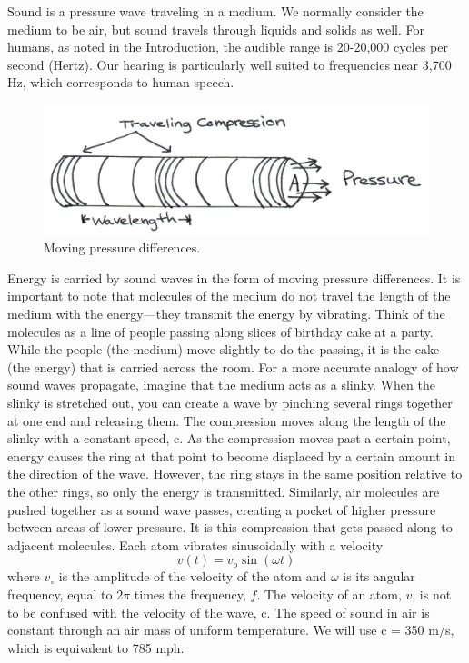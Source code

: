 Sound is a pressure wave traveling in a medium.  We normally consider the medium to be air, but sound travels through liquids and solids as well.  For humans, as noted in the Introduction, the audible range is 20-20,000 cycles per second (Hertz).  Our hearing is particularly well suited to frequencies near 3,700 Hz, which corresponds to human speech.  
\begin{figure}[htb]
	\centering
	\includegraphics[width=\textwidth]{./figures/Topic3/Fig3-1.jpg}
	\caption{Moving pressure differences.}
	\label{Fig3-1}
\end{figure}
Energy is carried by sound waves in the form of moving pressure differences.  It is important to note that molecules of the medium do not travel the length of the medium with the energy—they transmit the energy by vibrating.   Think of the molecules as a line of people passing along slices of birthday cake at a party.  While the people (the medium) move slightly to do the passing, it is the cake (the energy) that is carried across the room.  For a more accurate analogy of how sound waves propagate, imagine that the medium acts as a slinky.  When the slinky is stretched out, you can create a wave by pinching several rings together at one end and releasing them.  The compression moves along the length of the slinky with a constant speed, c.  As the compression moves past a certain point, energy causes the ring at that point to become displaced by a certain amount in the direction of the wave.  However, the ring stays in the same position relative to the other rings, so only the energy is transmitted.  Similarly, air molecules are pushed together as a sound wave passes, creating a pocket of higher pressure between areas of lower pressure.  It is this compression that gets passed along to adjacent molecules.  Each atom vibrates sinusoidally with a velocity
\begin{equation}\label{eqn3-1}
v(t) = v_o \sin\left(\omega t\right)
\end{equation}
where $v_{\circ}$ is the amplitude of the  velocity of the atom and $\omega$ is its angular frequency, equal to $2\pi$ times the frequency, $f$.  The velocity of an atom, $v$, is not to be confused with the velocity of the wave, c. The speed of sound in air is constant through an air mass of uniform temperature.  We will use c = 350 m/s, which is equivalent to 785 mph.  

